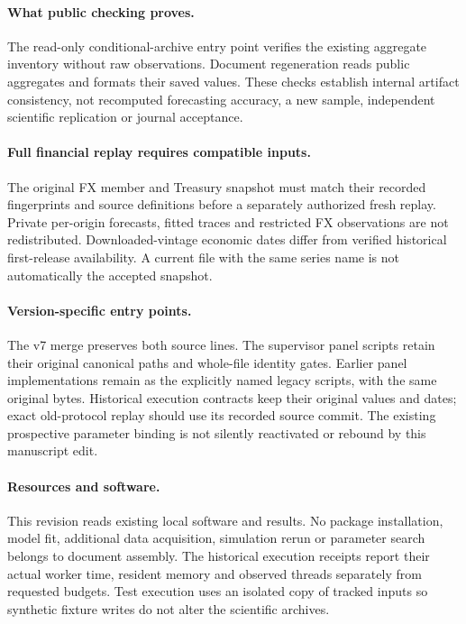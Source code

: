 \documentclass[11pt,a4paper]{article}
\begin{document}
\paragraph{What public checking proves.}
The read-only conditional-archive entry point verifies the existing aggregate
inventory without raw observations. Document regeneration reads public
aggregates and formats their saved values. These checks establish internal
artifact consistency, not recomputed forecasting accuracy, a new sample,
independent scientific replication or journal acceptance.

\paragraph{Full financial replay requires compatible inputs.}
The original FX member and Treasury snapshot must match their recorded
fingerprints and source definitions before a separately authorized fresh
replay. Private per-origin forecasts, fitted traces and restricted FX
observations are not redistributed. Downloaded-vintage economic dates differ
from verified historical first-release availability. A current file with the
same series name is not automatically the accepted snapshot.

\paragraph{Version-specific entry points.}
The v7 merge preserves both source lines. The supervisor panel scripts retain
their original canonical paths and whole-file identity gates. Earlier panel
implementations remain as the explicitly named legacy scripts, with the same
original bytes. Historical execution contracts keep their original values and
dates; exact old-protocol replay should use its recorded source commit.
The existing prospective parameter binding is not silently reactivated or
rebound by this manuscript edit.

\paragraph{Resources and software.}
This revision reads existing local software and results. No package installation,
model fit, additional data acquisition, simulation rerun or parameter search
belongs to document assembly. The historical execution receipts report their
actual worker time, resident memory and observed threads separately from
requested budgets. Test execution uses an isolated copy of tracked inputs so
synthetic fixture writes do not alter the scientific archives.
\end{document}
